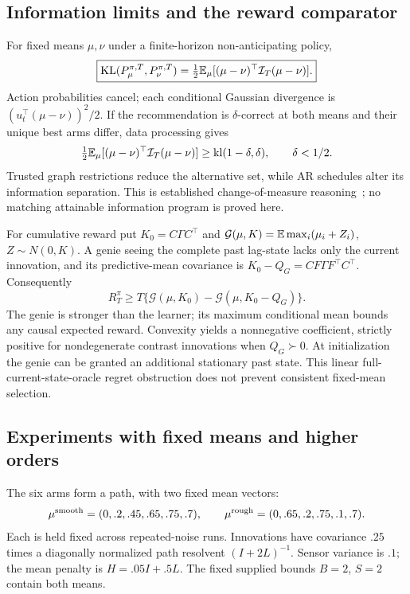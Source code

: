 \subsection{Information limits and the reward comparator}
For fixed means $\mu,\nu$ under a finite-horizon non-anticipating policy,
\begin{equation}
\boxed{\operatorname{KL}(P_\mu^{\pi,T},P_\nu^{\pi,T})
=\tfrac12\mathbb E_\mu[(\mu-\nu)^\top\mathcal I_T(\mu-\nu)].}
\label{spatiotemporal_bandits:eq:kl}
\end{equation}
Action probabilities cancel; each conditional Gaussian divergence is $(u_t^\top(\mu-\nu))^2/2$. If the recommendation is $\delta$-correct at both means and their unique best arms differ, data processing gives
\[
\tfrac12\mathbb E_\mu[(\mu-\nu)^\top\mathcal I_T(\mu-\nu)]
\ge\operatorname{kl}(1-\delta,\delta),\qquad\delta<1/2.
\]
Trusted graph restrictions reduce the alternative set, while AR schedules alter its information separation. This is established change-of-measure reasoning~\cite{collected11,collected12}; no matching attainable information program is proved here.

For cumulative reward put $K_0=C\Gamma C^\top$ and $\mathcal G(\mu,K)=\mathbb E\max_i(\mu_i+Z_i)$, $Z\sim N(0,K)$. A genie seeing the complete past lag-state lacks only the current innovation, and its predictive-mean covariance is $K_0-Q_G=CF\Gamma F^\top C^\top$. Consequently
\begin{equation}
\boxed{R_T^\pi\ge
T\{\mathcal G(\mu,K_0)-\mathcal G(\mu,K_0-Q_G)\}.}
\end{equation}
The genie is stronger than the learner; its maximum conditional mean bounds any causal expected reward. Convexity yields a nonnegative coefficient, strictly positive for nondegenerate contrast innovations when $Q_G\succ0$. At initialization the genie can be granted an additional stationary past state. This linear full-current-state-oracle regret obstruction does not prevent consistent fixed-mean selection.

\subsection{Experiments with fixed means and higher orders}
The six arms form a path, with two fixed mean vectors:
\[
\mu^{\rm smooth}=(0,.2,.45,.65,.75,.7),\qquad
\mu^{\rm rough}=(0,.65,.2,.75,.1,.7).
\]
Each is held fixed across repeated-noise runs. Innovations have covariance $.25$ times a diagonally normalized path resolvent $(I+2L)^{-1}$. Sensor variance is $.1$; the mean penalty is $H=.05I+.5L$. The fixed supplied bounds $B=2$, $S=2$ contain both means.

